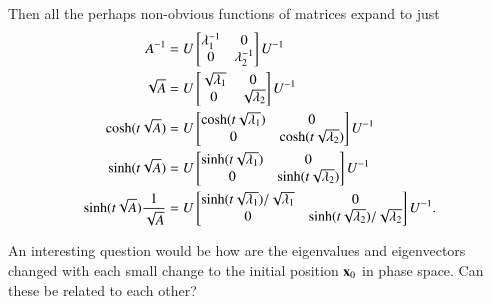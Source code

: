 Then all the perhaps non-obvious functions of matrices expand to just
\begin{subequations}
\label{eqn:hoopSpring:13}
\begin{align}
A^{-1} &= U 
\begin{bmatrix}
\lambda_1^{-1} & 0 \\
0 & \lambda_2^{-1} 
\end{bmatrix}
U^{-1} \\
\sqrt{A} &= U 
\begin{bmatrix}
\sqrt{\lambda_1} & 0 \\
0 & \sqrt{\lambda_2}
\end{bmatrix}
U^{-1} \\
\cosh(t \sqrt{A}) &= U 
\begin{bmatrix}
\cosh( t \sqrt{\lambda_1} ) & 0 \\
0 & \cosh( t \sqrt{\lambda_2} )
\end{bmatrix}
U^{-1} \\
\sinh(t \sqrt{A}) &= U 
\begin{bmatrix}
\sinh( t \sqrt{\lambda_1} ) & 0 \\
0 & \sinh( t \sqrt{\lambda_2} )
\end{bmatrix}
U^{-1} \\
\sinh(t \sqrt{A}) \frac{1}{\sqrt{A}} &= U 
\begin{bmatrix}
\sinh( t \sqrt{\lambda_1} )/\sqrt{\lambda_1} & 0 \\
0 & \sinh( t \sqrt{\lambda_2} )/\sqrt{\lambda_2}
\end{bmatrix}
U^{-1}.
\end{align}
\end{subequations}

An interesting question would be how are the eigenvalues and eigenvectors changed with each small change to the initial position $\mathbf{x}_0$ in phase space.  Can these be related to each other?

\EndNoBibArticle
